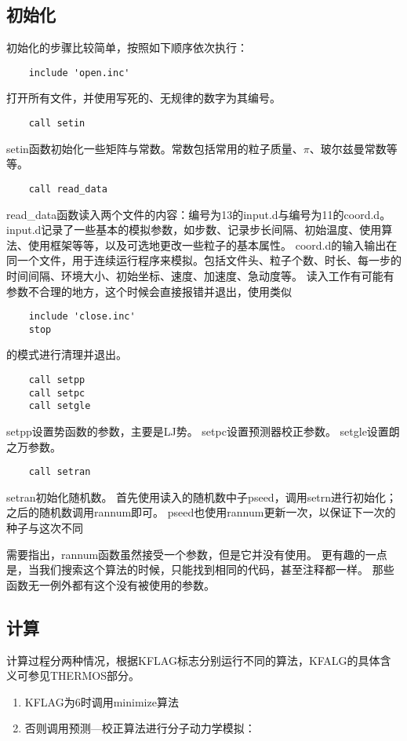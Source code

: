 \documentclass{ctexart}
\begin{document}
\subsection{初始化}
初始化的步骤比较简单，按照如下顺序依次执行：
\begin{verbatim}
    include 'open.inc'
\end{verbatim}
打开所有文件，并使用写死的、无规律的数字为其编号。
\begin{verbatim}
    call setin
\end{verbatim}
setin函数初始化一些矩阵与常数。常数包括常用的粒子质量、$\pi$、玻尔兹曼常数等等。
\begin{verbatim}
    call read_data
\end{verbatim}
read\_data函数读入两个文件的内容：编号为13的input.d与编号为11的coord.d。
input.d记录了一些基本的模拟参数，如步数、记录步长间隔、初始温度、使用算法、使用框架等等，以及可选地更改一些粒子的基本属性。
coord.d的输入输出在同一个文件，用于连续运行程序来模拟。包括文件头、粒子个数、时长、每一步的时间间隔、环境大小、初始坐标、速度、加速度、急动度等。
读入工作有可能有参数不合理的地方，这个时候会直接报错并退出，使用类似
\begin{verbatim}
    include 'close.inc'
    stop
\end{verbatim}
的模式进行清理并退出。
\begin{verbatim}
    call setpp
    call setpc
    call setgle
\end{verbatim}
setpp设置势函数的参数，主要是LJ势。
setpc设置预测器校正参数。
setgle设置朗之万参数。
\begin{verbatim}
    call setran
\end{verbatim}
setran初始化随机数。
首先使用读入的随机数中子pseed，调用setrn进行初始化；之后的随机数调用rannum即可。
pseed也使用rannum更新一次，以保证下一次的种子与这次不同

需要指出，rannum函数虽然接受一个参数，但是它并没有使用。
更有趣的一点是，当我们搜索这个算法的时候，只能找到相同的代码，甚至注释都一样。
那些函数无一例外都有这个没有被使用的参数。

\subsection{计算}
计算过程分两种情况，根据KFLAG标志分别运行不同的算法，KFALG的具体含义可参见THERMOS部分。

\begin{enumerate}
    \item KFLAG为6时调用minimize算法

    \item 否则调用预测—校正算法进行分子动力学模拟：
\end{enumerate}
\end{document}
